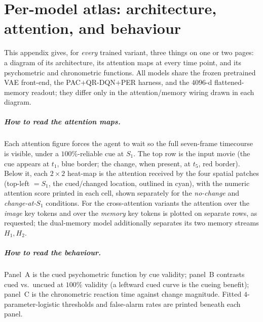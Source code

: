 \chapter{Per-model atlas: architecture, attention, and behaviour}
\label{app:atlas}

This appendix gives, for \emph{every} trained variant, three things on one or two pages: a
diagram of its architecture, its attention maps at every time point, and its psychometric and
chronometric functions. All models share the frozen pretrained VAE front-end, the
PAC$+$QR-DQN$+$PER harness, and the $4096$-d flattened-memory readout; they differ only in the
attention/memory wiring drawn in each diagram.

\paragraph{How to read the attention maps.} Each attention figure forces the agent to wait so
the full seven-frame timecourse is visible, under a $100\%$-reliable cue at $S_1$. The top row
is the input movie (the cue appears at $t_1$, blue border; the change, when present, at $t_5$,
red border). Below it, each $2\times2$ heat-map is the attention received by the four spatial
patches (top-left $=S_1$, the cued/changed location, outlined in cyan), with the numeric
attention score printed in each cell, shown separately for the \emph{no-change} and
\emph{change-at-}$S_1$ conditions. For the cross-attention variants the attention over the
\emph{image} key tokens and over the \emph{memory} key tokens is plotted on separate rows, as
requested; the dual-memory model additionally separates its two memory streams $H_1,H_2$.

\paragraph{How to read the behaviour.} Panel~A is the cued psychometric function by cue
validity; panel~B contrasts cued vs.\ uncued at $100\%$ validity (a leftward cued curve is the
cueing benefit); panel~C is the chronometric reaction time against change magnitude. Fitted
$4$-parameter-logistic thresholds and false-alarm rates are printed beneath each panel.

\begin{center}\archlegend\end{center}

